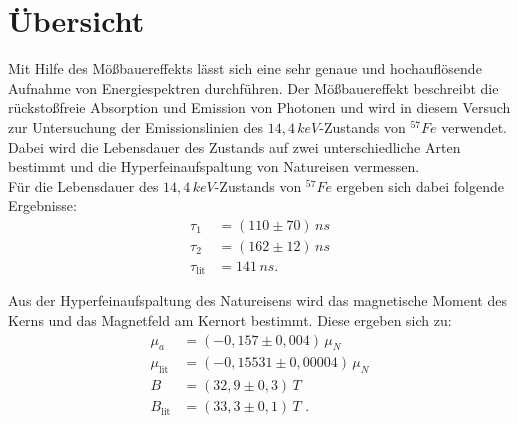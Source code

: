 \section*{Übersicht}

Mit Hilfe des Mößbauereffekts lässt sich eine sehr genaue und hochauflösende Aufnahme von Energiespektren durchführen. Der Mößbauereffekt beschreibt die rückstoßfreie Absorption und Emission von Photonen und wird in diesem Versuch zur Untersuchung der Emissionslinien des $14,4\,\si{keV}$-Zustands von $^{57}Fe$ verwendet. Dabei wird die Lebensdauer des Zustands auf zwei unterschiedliche Arten bestimmt und die Hyperfeinaufspaltung von Natureisen vermessen.\\

Für die Lebensdauer des $14,4\,\si{keV}$-Zustands von $^{57}Fe$ ergeben sich dabei folgende Ergebnisse:
\begin{align*}
	\tau_1&=(110\pm70)\,\si{ns}\\
	\tau_2&=(162\pm12)\,\si{ns}\\
	\tau_\text{lit}&=141\,\si{ns}\text{.}
\end{align*}

Aus der Hyperfeinaufspaltung des Natureisens wird das magnetische Moment des Kerns und das Magnetfeld am Kernort bestimmt. Diese ergeben sich zu:
\begin{align*}
	\mu_a&=(-0,157\pm0,004)\,\mu_N\\
	\mu_\text{lit}&=(-0,15531\pm0,00004)\,\mu_N\\
	B&=(32,9\pm0,3)\,\si{T}\\
	B_\text{lit}&=(33,3\pm0,1)\,\si{T}\text{ .}
\end{align*}